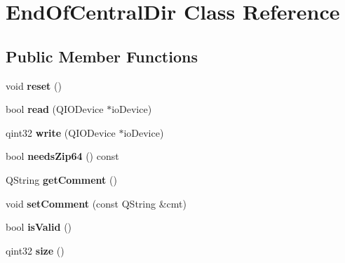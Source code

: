 \hypertarget{class_end_of_central_dir}{}\section{End\+Of\+Central\+Dir Class Reference}
\label{class_end_of_central_dir}
\subsection*{Public Member Functions}
\begin{DoxyCompactItemize}
\item 
void {\bfseries reset} ()\hypertarget{class_end_of_central_dir_a021549ad5ed85d9412ff22160820648b}{}\label{class_end_of_central_dir_a021549ad5ed85d9412ff22160820648b}

\item 
bool {\bfseries read} (Q\+I\+O\+Device $\ast$io\+Device)\hypertarget{class_end_of_central_dir_a0b464546ce70df0a14ef73f3d6067399}{}\label{class_end_of_central_dir_a0b464546ce70df0a14ef73f3d6067399}

\item 
qint32 {\bfseries write} (Q\+I\+O\+Device $\ast$io\+Device)\hypertarget{class_end_of_central_dir_ae26151a3c04821cb7a626d7c54ad5ced}{}\label{class_end_of_central_dir_ae26151a3c04821cb7a626d7c54ad5ced}

\item 
bool {\bfseries needs\+Zip64} () const \hypertarget{class_end_of_central_dir_a4ba4d67e7bf0c2101ccee1eab9c95c4e}{}\label{class_end_of_central_dir_a4ba4d67e7bf0c2101ccee1eab9c95c4e}

\item 
Q\+String {\bfseries get\+Comment} ()\hypertarget{class_end_of_central_dir_a57e0851ab3a95051fa2be528319fb6c8}{}\label{class_end_of_central_dir_a57e0851ab3a95051fa2be528319fb6c8}

\item 
void {\bfseries set\+Comment} (const Q\+String \&cmt)\hypertarget{class_end_of_central_dir_a790d0466fd980c4d21e31e9f9a420ca1}{}\label{class_end_of_central_dir_a790d0466fd980c4d21e31e9f9a420ca1}

\item 
bool {\bfseries is\+Valid} ()\hypertarget{class_end_of_central_dir_a9440785d96dc5656160f811714d450e2}{}\label{class_end_of_central_dir_a9440785d96dc5656160f811714d450e2}

\item 
qint32 {\bfseries size} ()\hypertarget{class_end_of_central_dir_afc1e2e8cb3a56573dc7f80123e4b178b}{}\label{class_end_of_central_dir_afc1e2e8cb3a56573dc7f80123e4b178b}

\end{DoxyCompactItemize}
